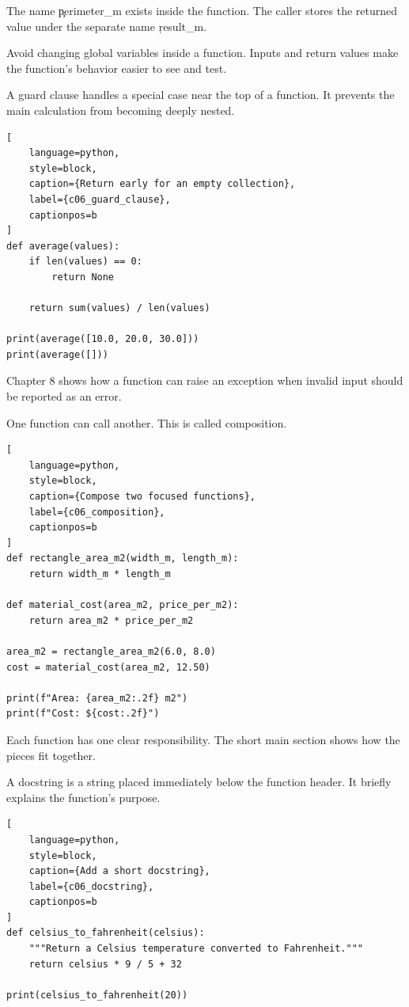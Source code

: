 The name \c{perimeter_m} exists inside the function. The caller stores the
returned value under the separate name \c{result_m}.

Avoid changing global variables inside a function. Inputs and return values
make the function's behavior easier to see and test.


A guard clause handles a special case near the top of a function. It prevents
the main calculation from becoming deeply nested.

\begin{lstlisting}[
    language=python,
    style=block,
    caption={Return early for an empty collection},
    label={c06_guard_clause},
    captionpos=b
]
def average(values):
    if len(values) == 0:
        return None

    return sum(values) / len(values)

print(average([10.0, 20.0, 30.0]))
print(average([]))
\end{lstlisting}

Chapter 8 shows how a function can raise an exception when invalid input should
be reported as an error.


One function can call another. This is called composition.

\begin{lstlisting}[
    language=python,
    style=block,
    caption={Compose two focused functions},
    label={c06_composition},
    captionpos=b
]
def rectangle_area_m2(width_m, length_m):
    return width_m * length_m

def material_cost(area_m2, price_per_m2):
    return area_m2 * price_per_m2

area_m2 = rectangle_area_m2(6.0, 8.0)
cost = material_cost(area_m2, 12.50)

print(f"Area: {area_m2:.2f} m2")
print(f"Cost: ${cost:.2f}")
\end{lstlisting}

Each function has one clear responsibility. The short main section shows how
the pieces fit together.


A docstring is a string placed immediately below the function header. It
briefly explains the function's purpose.

\begin{lstlisting}[
    language=python,
    style=block,
    caption={Add a short docstring},
    label={c06_docstring},
    captionpos=b
]
def celsius_to_fahrenheit(celsius):
    """Return a Celsius temperature converted to Fahrenheit."""
    return celsius * 9 / 5 + 32

print(celsius_to_fahrenheit(20))
\end{lstlisting}

